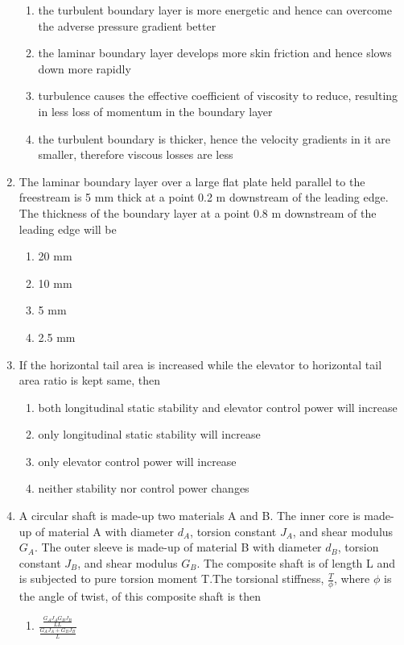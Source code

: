 \documentclass[journal]{IEEEtran}
\begin{document}
\begin{enumerate}[start=35]
    \begin{enumerate}
        \item the turbulent boundary layer is more energetic and hence can overcome the adverse pressure gradient better 
        \item the laminar boundary layer develops more skin friction and hence slows down more rapidly 
        \item turbulence causes the effective coefficient of viscosity to reduce, resulting in less loss of momentum in the boundary layer 
        \item the turbulent boundary is thicker, hence the velocity gradients in it are smaller, therefore viscous losses are less
    \end{enumerate}
\item The laminar boundary layer over a large flat plate held parallel to the freestream is 5 mm
    thick at a point 0.2 m downstream of the leading edge. The thickness of the boundary layer at a point 0.8 m downstream of the leading edge will be 
    \begin{multicols}{4}
        \begin{enumerate}
            \item 20 mm
            \item 10 mm
            \item 5 mm
            \item 2.5 mm
        \end{enumerate}
    \end{multicols}
\item If the horizontal tail area is increased while the elevator to horizontal tail area ratio is kept same, then 
    \begin{enumerate}
        \item both longitudinal static stability and elevator control power will increase 
        \item only longitudinal static stability will increase 
        \item only elevator control power will increase
        \item neither stability nor control power changes 
    \end{enumerate}
\item A circular shaft is made-up two materials A and B. The inner core is made-up of material A with diameter $d_A$, torsion constant $J_A$, and shear modulus $G_A$. The outer sleeve is made-up of material B with diameter $d_B$, torsion constant $J_B$, and shear modulus $G_B$. The composite shaft is of length L and is subjected to pure torsion moment T.The torsional stiffness, $\frac{T}{\phi}$, where $\phi$ is the angle of twist, of this composite shaft is then\\

\begin{enumerate}
   \item $\frac{\frac{G_AJ_AG_BJ_B}{LL}}{\frac{G_AJ_A+G_BJ_B}{L}}$
   

\end{enumerate}
\end{enumerate}
\end{document}
